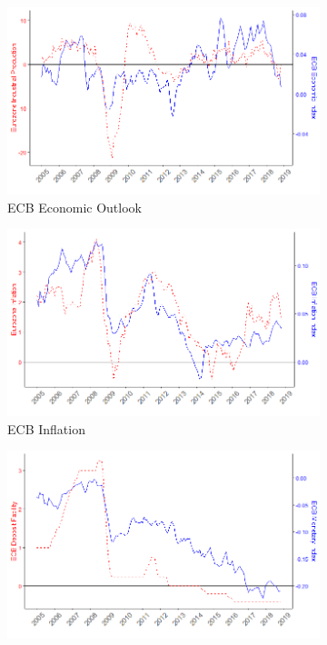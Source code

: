 \documentclass[review]{elsarticle}
\begin{document}
   \begin{figure}[h!]
    \centering
\begin{subfigure}{6cm}
    \includegraphics{ECB_eco_Industrial_prod.png}
    \caption{ECB Economic Outlook}
    \label{ECB_eco}
\end{subfigure}
\hfil
\begin{subfigure}{6cm}
    \includegraphics{ECB_inf_inf.png}
    \caption{ECB Inflation}
    \label{ECB_inf}
\end{subfigure}
\vfil
\begin{subfigure}{6cm}
    \includegraphics{ECB_mon_df.png}

\end{subfigure}
\end{figure}
\end{document}

